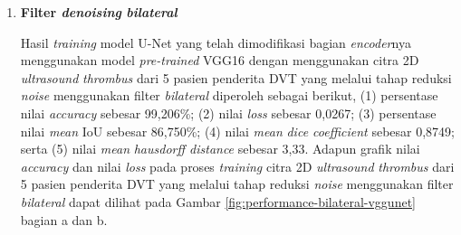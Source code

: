 \begin{enumerate}
	
	\item \textbf{Filter \textit{denoising} \textit{bilateral}}
	
	Hasil \textit{training} model U-Net yang telah dimodifikasi bagian \textit{encoder}nya menggunakan model \textit{pre-trained} VGG16 dengan menggunakan citra 2D \textit{ultrasound} \textit{thrombus} dari 5 pasien penderita DVT yang melalui tahap reduksi \textit{noise} menggunakan filter \textit{bilateral} diperoleh sebagai berikut, (1) persentase nilai \textit{accuracy} sebesar 99,206\%; (2) nilai \textit{loss} sebesar 0,0267; (3) persentase nilai \textit{mean} IoU sebesar 86,750\%; (4) nilai \textit{mean} \textit{dice coefficient} sebesar 0,8749; serta (5) nilai \textit{mean} \textit{hausdorff distance} sebesar 3,33. Adapun grafik nilai \textit{accuracy} dan nilai \textit{loss} pada proses \textit{training} citra 2D \textit{ultrasound} \textit{thrombus} dari 5 pasien penderita DVT yang melalui tahap reduksi \textit{noise} menggunakan filter \textit{bilateral} dapat dilihat pada Gambar \ref{fig:performance-bilateral-vggunet} bagian a dan b.
	

\end{enumerate}
